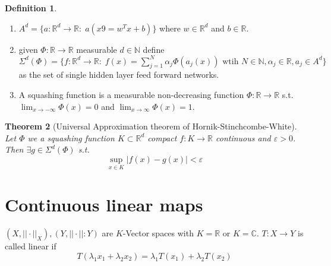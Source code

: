 \documentclass[a4paper, 12pt]{article}
\theoremstyle{plain}
\newtheorem{theorem}{Theorem}[subsection] %
\theoremstyle{definition}
\newtheorem{definition}[theorem]{Definition} %
\theoremstyle{lemma}
\theoremstyle{remark}
\theoremstyle{corollary}
\theoremstyle{example}
\begin{document}
	\begin{definition}
		\begin{enumerate}
			\item $A^d = \{a: \mathbb{R}^d \to \mathbb{R}: \; a(x9 = w^Tx+b)\}$ where $w \in \mathbb{R}^d$ and $b \in \mathbb{R}$.
			\item given $\Phi: \mathbb{R} \to \mathbb{R}$ measurable $d \in \mathbb{N}$ define $\Sigma^d(\Phi) = \{f: \mathbb{R}^d \to \mathbb{R}: \; f(x) = \sum_{j=1}^N \alpha_j \Phi(a_j(x)) \text{ wtih } N \in \mathbb{N}, \alpha_j \in \mathbb{R}, a_j \in A^d\}$ as the set of single hidden layer feed forward networks.
			\item A squashing function is a measurable non-decreasing function $\Phi: \mathbb{R} \to \mathbb{R}$ s.t. $\lim_{x \to -\infty} \Phi(x) = 0$ and $\lim_{x \to \infty} \Phi(x) = 1$.
		\end{enumerate}
	\end{definition}
	\begin{theorem}[Universal Approximation theorem of Hornik-Stinchcombe-White]
		Let $\Phi$ we a squashing function $K\subset \mathbb{R}^d$ compact $f:K \to \mathbb{R}$ continuous and $\varepsilon > 0$. Then $\exists g \in \Sigma^d(\Phi)$ s.t. \[\sup_{x \in K} \left|f(x)-g(x)\right| < \varepsilon\]
	\end{theorem}

\section{Continuous linear maps}
	$(X,||\cdot ||_X), (Y,||\cdot ||:Y)$ are $K$-Vector spaces with $K = \mathbb{R}$ or $K = \mathbb{C}$. $T:X \to Y$ is called linear if \[T(\lambda_1x_1 + \lambda_2 x_2) = \lambda_1 T(x_1) + \lambda_2 T(x_2)\]
\end{document}

